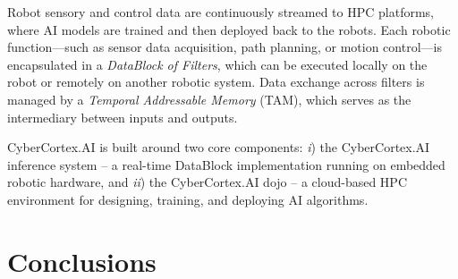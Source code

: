 \documentclass[journal]{IEEEtran}
\begin{document}
Robot sensory and control data are continuously streamed to HPC platforms, where AI models are trained and then deployed back to the robots. Each robotic function—such as sensor data acquisition, path planning, or motion control—is encapsulated in a \textit{DataBlock of Filters}, which can be executed locally on the robot or remotely on another robotic system. Data exchange across filters is managed by a \textit{Temporal Addressable Memory} (TAM), which serves as the intermediary between inputs and outputs.

CyberCortex.AI is built around two core components: \textit{i}) the CyberCortex.AI inference system – a real-time DataBlock implementation running on embedded robotic hardware, and \textit{ii}) the CyberCortex.AI dojo – a cloud-based HPC environment for designing, training, and deploying AI algorithms.

\section{Conclusions}
\label{sec:conclusions}







\end{document}
